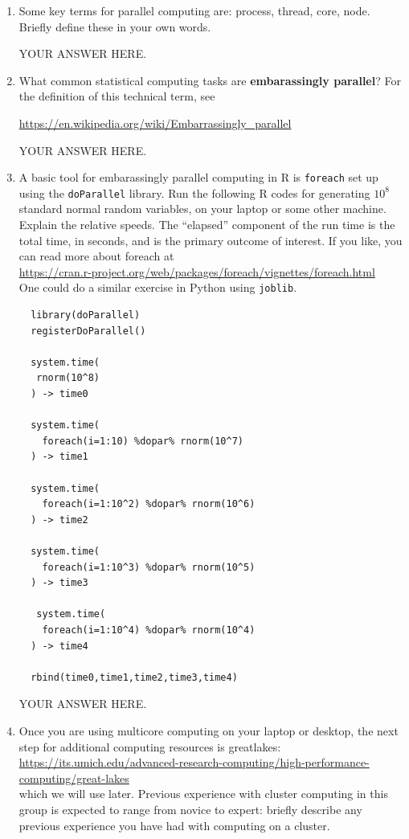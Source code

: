 \documentclass[12pt]{article}
\begin{document}
\begin{enumerate}

\item Some key terms for parallel computing are: process, thread, core, node. Briefly define these in your own words.

YOUR ANSWER HERE.
  
\item What common statistical computing tasks are {\bf embarassingly parallel}? For the definition of this technical term, see

  \url{https://en.wikipedia.org/wiki/Embarrassingly_parallel} 

YOUR ANSWER HERE.

\item A basic tool for embarassingly parallel computing in R is \texttt{foreach} set up using the \texttt{doParallel} library. Run the following R codes for generating $10^8$ standard normal random variables, on your laptop or some other machine. Explain the relative speeds. The ``elapsed'' component of the run time is the total time, in seconds, and is the primary outcome of interest. If you like, you can read more about foreach at\\
\url{https://cran.r-project.org/web/packages/foreach/vignettes/foreach.html}\\
One could do a similar exercise in Python using \texttt{joblib}.

\begin{verbatim} 
  library(doParallel)
  registerDoParallel()

  system.time(
   rnorm(10^8)
  ) -> time0

  system.time(
    foreach(i=1:10) %dopar% rnorm(10^7)
  ) -> time1

  system.time(
    foreach(i=1:10^2) %dopar% rnorm(10^6)
  ) -> time2

  system.time(
    foreach(i=1:10^3) %dopar% rnorm(10^5)
  ) -> time3

   system.time(
    foreach(i=1:10^4) %dopar% rnorm(10^4)
  ) -> time4
  
  rbind(time0,time1,time2,time3,time4)
\end{verbatim}

  YOUR ANSWER HERE.

\item Once you are using multicore computing on your laptop or desktop, the next step for additional computing resources is greatlakes:\\
  \url{https://its.umich.edu/advanced-research-computing/high-performance-computing/great-lakes}\\
which we will use later. Previous experience with cluster computing in this group is expected to range from novice to expert: briefly describe any previous experience you have had with computing on a cluster.


\end{enumerate}
\end{document}
